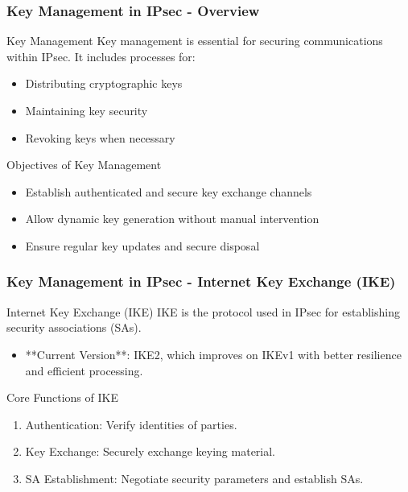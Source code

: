 \documentclass{beamer}
\begin{document}
\begin{frame}[fragile]
    \frametitle{Key Management in IPsec - Overview}
    \begin{block}{Key Management}
        Key management is essential for securing communications within IPsec. It includes processes for:
        \begin{itemize}
            \item Distributing cryptographic keys
            \item Maintaining key security
            \item Revoking keys when necessary
        \end{itemize}
    \end{block}
    
    \begin{block}{Objectives of Key Management}
        \begin{itemize}
            \item Establish authenticated and secure key exchange channels
            \item Allow dynamic key generation without manual intervention
            \item Ensure regular key updates and secure disposal
        \end{itemize}
    \end{block}
\end{frame}

\begin{frame}[fragile]
    \frametitle{Key Management in IPsec - Internet Key Exchange (IKE)}
    \begin{block}{Internet Key Exchange (IKE)}
        IKE is the protocol used in IPsec for establishing security associations (SAs).
        \begin{itemize}
            \item **Current Version**: IKE2, which improves on IKEv1 with better resilience and efficient processing.
        \end{itemize}
    \end{block}
    
    \begin{block}{Core Functions of IKE}
        \begin{enumerate}
            \item Authentication: Verify identities of parties.
            \item Key Exchange: Securely exchange keying material.
            \item SA Establishment: Negotiate security parameters and establish SAs.
        \end{enumerate}
    \end{block}
\end{frame}
\end{document}
